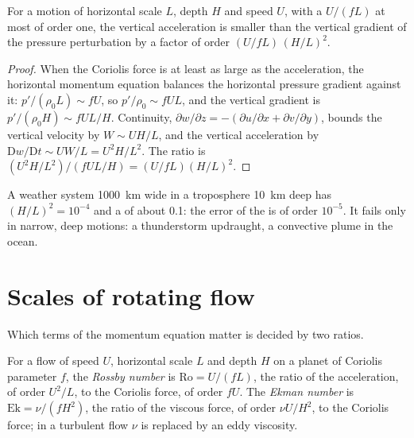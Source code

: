 \begin{proposition}\label{prop:b3:gfd-foundations:hydrostatic}
For a motion of horizontal scale $L$, depth $H$ and speed $U$, with a
 $U/(fL)$ at most of order one, the vertical acceleration is
smaller than the vertical gradient of the pressure perturbation by a factor
of order $(U/fL)\,(H/L)^2$.
\end{proposition}

\begin{proof}
When the Coriolis force is at least as large as the acceleration, the
horizontal momentum equation balances the horizontal pressure gradient
against it: $p'/(\rho_0 L) \sim fU$, so $p'/\rho_0 \sim fUL$, and the vertical
gradient is $p'/(\rho_0 H) \sim fUL/H$. Continuity, $\partial w/\partial z
= -(\partial u/\partial x + \partial v/\partial y)$, bounds the vertical
velocity by $W \sim UH/L$, and the vertical acceleration by
$\mathrm Dw/\mathrm Dt \sim UW/L = U^2H/L^2$. The ratio is $(U^2H/L^2)/(fUL/H)
= (U/fL)(H/L)^2$.
\end{proof}

A weather system \qty{1000}{km} wide in a troposphere \qty{10}{km} deep has
$(H/L)^2 = 10^{-4}$ and a  of about 0.1: the error of the
 is of order $10^{-5}$. It fails only in narrow, deep motions: a
thunderstorm updraught, a convective plume in the ocean.

\section{Scales of rotating flow}\label{sec:b3:gfd-foundations:scales}

Which terms of the momentum equation matter is decided by two ratios.

\begin{definition}\label{def:b3:gfd-foundations:numbers}
For a flow of speed $U$, horizontal scale $L$ and depth $H$ on a planet of
Coriolis parameter $f$, the \emph{Rossby number} is
$\mathrm{Ro} = U/(fL)$, the ratio of the acceleration, of order $U^2/L$,
to the Coriolis force, of order $fU$. The \emph{Ekman
number} is $\mathrm{Ek} = \nu/(fH^2)$, the ratio of
the viscous force, of order $\nu U/H^2$, to the Coriolis force; in a
turbulent flow $\nu$ is replaced by an eddy viscosity.
\end{definition}

